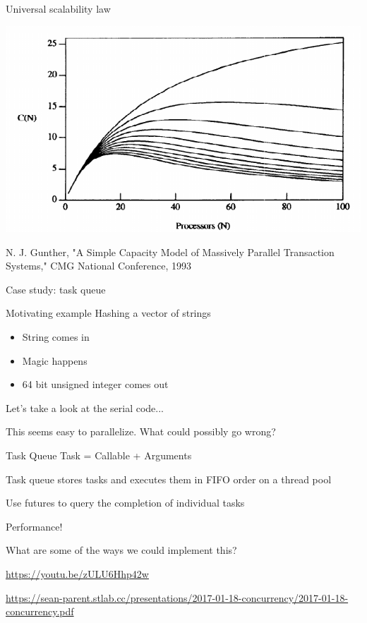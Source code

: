 \documentclass{beamer}
\begin{document}
\begin{frame}{Universal scalability law}
\begin{center}
\includegraphics[width=\textwidth]{usl.png}
\end{center}

\tiny
N. J. Gunther, "A Simple Capacity Model of Massively Parallel Transaction Systems," CMG National Conference, 1993
\end{frame}

\begin{frame}[standout]
Case study: task queue
\end{frame}

\begin{frame}{Motivating example}
Hashing a vector of strings
\begin{itemize}
\item String comes in
\item Magic happens
\item 64 bit unsigned integer comes out
\end{itemize}

Let's take a look at the serial code...

This seems easy to parallelize. What could possibly go wrong?
\end{frame}

\begin{frame}{Task Queue}
Task = Callable + Arguments

Task queue stores tasks and executes them in FIFO order on a thread pool

Use futures to query the completion of individual tasks

Performance!

What are some of the ways we could implement this?

\tiny\vfill
\url{https://youtu.be/zULU6Hhp42w}

\url{https://sean-parent.stlab.cc/presentations/2017-01-18-concurrency/2017-01-18-concurrency.pdf}
\end{frame}
\end{document}
